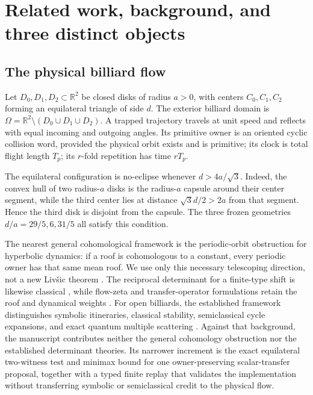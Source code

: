 \documentclass[11pt,a4paper]{article}
\theoremstyle{definition}
\theoremstyle{remark}
\begin{document}
\section{Related work, background, and three distinct objects}

\subsection{The physical billiard flow}

Let \(D_0,D_1,D_2\subset\mathbb R^2\) be closed disks of radius \(a>0\), with centers \(C_0,C_1,C_2\) forming an equilateral triangle of side \(d\). The exterior billiard domain is
\(\Omega=\mathbb R^2\setminus(D_0\cup D_1\cup D_2)\). A trapped trajectory travels at unit speed and reflects with equal incoming and outgoing angles. Its primitive owner is an oriented cyclic collision word, provided the physical orbit exists and is primitive; its clock is total flight length \(T_p\); its \(r\)-fold repetition has time \(rT_p\).

The equilateral configuration is no-eclipse whenever \(d>4a/\sqrt3\).
Indeed, the convex hull of two radius-\(a\) disks is the radius-\(a\)
capsule around their center segment, while the third center lies at distance
\(\sqrt3d/2>2a\) from that segment.  Hence the third disk is disjoint from
the capsule.  The three frozen geometries \(d/a=29/5,6,31/5\) all satisfy
this condition.

The nearest general cohomological framework is the periodic-orbit obstruction for hyperbolic dynamics: if a roof is cohomologous to a constant, every periodic owner has that same mean roof. We use only this necessary telescoping direction, not a new Liv\v{s}ic theorem \citep[main cohomology criteria]{Livsic1972}.%
The reciprocal determinant for a finite-type shift is likewise classical \citep[pp.~43--49]{BowenLanford1970},%
while flow-zeta and transfer-operator formulations retain the roof and dynamical weights \citep[Secs.~1--3]{Ruelle1976}.%
For open billiards, the established framework distinguishes symbolic itineraries, classical stability, semiclassical cycle expansions, and exact quantum multiple scattering \citep[Secs.~2--6]{Wirzba1999}.%
Against that background, the manuscript contributes neither the general cohomology obstruction nor the established determinant theories. Its narrower increment is the exact equilateral two-witness test and minimax bound for one owner-preserving scalar-transfer proposal, together with a typed finite replay that validates the implementation without transferring symbolic or semiclassical credit to the physical flow.
\end{document}
